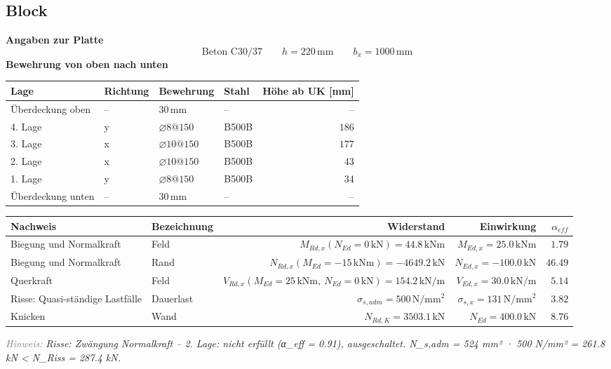 \documentclass[11pt,a4paper]{article}
\newcommand{\hinweis}[2]{\par\noindent\textcolor{gray}{\textit{#1:}} \textit{#2}\par}
\begin{document}
\subsection{Block}
\noindent\textbf{Angaben zur Platte}
\begin{equation*}
\text{Beton C30/37} \qquad h = 220\,\mathrm{mm} \qquad b_x = 1000\,\mathrm{mm}
\end{equation*}
\noindent\textbf{Bewehrung von oben nach unten}
\begin{longtable}{llllr}
\hline
Lage & Richtung & Bewehrung & Stahl & Höhe ab UK [mm] \\
\hline
\endhead
Überdeckung oben & – & $30\,\mathrm{mm}$ & – & – \\
4. Lage & y & $\varnothing 8@150$ & B500B & $186$ \\
3. Lage & x & $\varnothing 10@150$ & B500B & $177$ \\
2. Lage & x & $\varnothing 10@150$ & B500B & $43$ \\
1. Lage & y & $\varnothing 8@150$ & B500B & $34$ \\
Überdeckung unten & – & $30\,\mathrm{mm}$ & – & – \\
\hline
\end{longtable}
\begin{xltabular}{\linewidth}{>{\raggedright\arraybackslash}X>{\raggedright\arraybackslash}Xrrr}
\hline
Nachweis & Bezeichnung & Widerstand & Einwirkung & $\alpha_{eff}$ \\
\hline
\endhead
Biegung und Normalkraft & Feld & $M_{Rd,x}(N_{Ed} = 0\,\mathrm{kN}) = 44.8\,\mathrm{kNm}$ & $M_{Ed,x} = 25.0\,\mathrm{kNm}$ & $1.79$ \\
Biegung und Normalkraft & Rand & $N_{Rd,x}(M_{Ed} = -15\,\mathrm{kNm}) = -4649.2\,\mathrm{kN}$ & $N_{Ed,x} = -100.0\,\mathrm{kN}$ & $46.49$ \\
Querkraft & Feld & $V_{Rd,x}(M_{Ed} = 25\,\mathrm{kNm},\ N_{Ed} = 0\,\mathrm{kN}) = 154.2\,\mathrm{kN}/\mathrm{m}$ & $V_{Ed,x} = 30.0\,\mathrm{kN}/\mathrm{m}$ & $5.14$ \\
Risse: Quasi-ständige Lastfälle & Dauerlast & $\sigma_{s,adm} = 500\,\mathrm{N}/\mathrm{mm}^{2}$ & $\sigma_{s,x} = 131\,\mathrm{N}/\mathrm{mm}^{2}$ & $3.82$ \\
Knicken & Wand & $N_{Rd,K} = 3503.1\,\mathrm{kN}$ & $N_{Ed} = 400.0\,\mathrm{kN}$ & $8.76$ \\
\hline
\end{xltabular}
\hinweis{Hinweis}{Risse: Zwängung Normalkraft – 2. Lage: nicht erfüllt (α\_eff = 0.91), ausgeschaltet. N\_s,adm = 524 mm² · 500 N/mm² = 261.8 kN < N\_Riss = 287.4 kN.}
\end{document}
